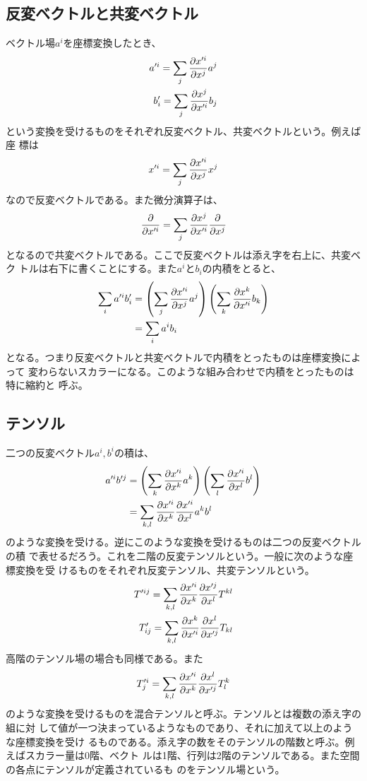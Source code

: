     \subsection{反変ベクトルと共変ベクトル}
        ベクトル場$a^i$を座標変換したとき、
        \begin{eqnarray*}
            a'^i = \sum_j \pd[x'^i]{x^j}a^j\\
            b'_i = \sum_j \pd[x^j]{x'^i}b_j
        \end{eqnarray*}
        という変換を受けるものをそれぞれ反変ベクトル、共変ベクトルという。例えば座
        標は
            \[x'^i = \sum_j \pd[x'^i]{x^j}x^j\]
        なので反変ベクトルである。また微分演算子は、
            \[\pd{x'^i} = \sum_j \pd[x^j]{x'^i}\pd{x^j}\]
        となるので共変ベクトルである。ここで反変ベクトルは添え字を右上に、共変ベク
        トルは右下に書くことにする。また$a^iとb_i$の内積をとると、
        \begin{align*}
            \sum_i a'^ib'_i &= \lr{\sum_j \pd[x'^i]{x^j}a^j}
            \lr{\sum_k \pd[x^k]{x'^i}b_k}\\
            &= \sum_i a^ib_i
        \end{align*}
        となる。つまり反変ベクトルと共変ベクトルで内積をとったものは座標変換によって
        変わらないスカラーになる。このような組み合わせで内積をとったものは特に縮約と
        呼ぶ。
    \subsection{テンソル}
        二つの反変ベクトル$a^i,b^i$の積は、
        \begin{align*}
            a'^ib'^j &= \lr{\sum_k \pd[x'^i]{x^k}a^k}
            \lr{\sum_l \pd[x'^i]{x^l}b^l}\\
            &= \sum_{k,l} \pd[x'^i]{x^k}\pd[x'^i]{x^l}a^kb^l
        \end{align*}
        のような変換を受ける。逆にこのような変換を受けるものは二つの反変ベクトルの積
        で表せるだろう。これを二階の反変テンソルという。一般に次のような座標変換を受
        けるものをそれぞれ反変テンソル、共変テンソルという。
        \begin{eqnarray*}
            T'^{ij} = \sum_{k,l}\pd[x'^i]{x^k}\pd[x'^j]{x^l}T^{kl}\\
            T'_{ij} = \sum_{k,l}\pd[x^k]{x'^i}\pd[x^l]{x'^j}T_{kl}
        \end{eqnarray*}
        高階のテンソル場の場合も同様である。また
            \[T'^i_j = \sum_{k,l}\pd[x'^i]{x^k}\pd[x^l]{x'^j}T^k_l\]
        のような変換を受けるものを混合テンソルと呼ぶ。テンソルとは複数の添え字の組に対
        して値が一つ決まっているようなものであり、それに加えて以上のような座標変換を受け
        るものである。添え字の数をそのテンソルの階数と呼ぶ。例えばスカラー量は0階、ベクト
        ルは1階、行列は2階のテンソルである。また空間の各点にテンソルが定義されているも
        のをテンソル場という。\\
    
